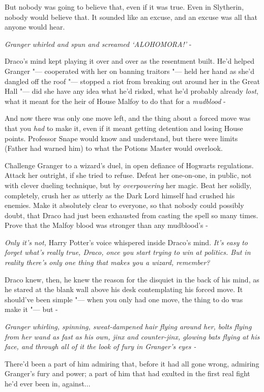 But nobody was going to believe that, even if it was true. Even in
Slytherin, nobody would believe that. It sounded like an excuse, and an
excuse was all that anyone would hear.

\emph{Granger whirled and spun and screamed `ALOHOMORA!'} -

Draco's mind kept playing it over and over as the resentment built. He'd
helped Granger "--- cooperated with her on banning traitors "--- held her hand
as she'd dangled off the roof "--- stopped a riot from breaking out around
her in the Great Hall "--- did she have any idea what he'd risked, what
he'd probably already \emph{lost}, what it meant for the heir of House
Malfoy to do that for a \emph{mudblood} -

And now there was only one move left, and the thing about a forced move
was that you \emph{had} to make it, even if it meant getting detention
and losing House points. Professor Snape would know and understand, but
there were limits (Father had warned him) to what the Potions Master
would overlook.

Challenge Granger to a wizard's duel, in open defiance of Hogwarts
regulations. Attack her outright, if she tried to refuse. Defeat her
one-on-one, in public, not with clever dueling technique, but by
\emph{overpowering} her magic. Beat her solidly, completely, crush her
as utterly as the Dark Lord himself had crushed his enemies. Make it
absolutely clear to everyone, so that nobody could possibly doubt, that
Draco had just been exhausted from casting the spell so many times.
Prove that the Malfoy blood was stronger than any mudblood's -

\emph{Only it's not,} Harry Potter's voice whispered inside Draco's
mind. \emph{It's easy to forget what's really true, Draco, once you
start trying to win at politics. But in reality there's only one thing
that makes you a wizard, remember?}

Draco knew, then, he knew the reason for the disquiet in the back of his
mind, as he stared at the blank wall above his desk contemplating his
forced move. It should've been simple "--- when you only had one move, the
thing to do was make it "--- but -

\emph{Granger whirling, spinning, sweat-dampened hair flying around her,
bolts flying from her wand as fast as his own, jinx and counter-jinx,
glowing bats flying at his face, and through all of it the look of fury
in Granger's eyes -}

There'd been a part of him admiring that, before it had all gone wrong,
admiring Granger's fury and power; a part of him that had exulted in the
first real fight he'd ever been in, against...

